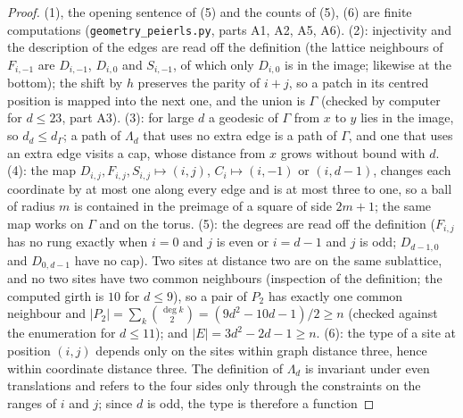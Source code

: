\documentclass[aps,prx,onecolumn,10pt,nofootinbib,longbibliography,floatfix]{revtex4-2}
\theoremstyle{remark}
\begin{document}
\begin{proof}
(1), the opening sentence of (5) and the counts of (5), (6) are finite computations %
(\texttt{geometry\_peierls.py}, parts A1, A2, A5, A6). (2): injectivity and the description of the edges are read %
off the definition (the lattice neighbours of $F_{i,-1}$ are $D_{i,-1}$, $D_{i,0}$ and $S_{i,-1}$, of which only
$D_{i,0}$ is in the image; likewise at the bottom); the shift by $h$ preserves the parity of $i+j$, so a patch in
its centred position is mapped into the next one, and the union is $\Gamma$ (checked by computer for $d\le23$, part %
A3). (3): for large $d$ a geodesic of $\Gamma$ from $x$ to $y$ lies in the image, so $d_d\le d_\Gamma$; a path of %
$\Lambda_d$ that uses no extra edge is a path of $\Gamma$, and one that uses an extra edge visits a cap, whose
distance from $x$ grows without bound with $d$. (4): the map $D_{i,j},F_{i,j},S_{i,j}\mapsto(i,j)$, %
$C_i\mapsto(i,-1)$ or $(i,d-1)$, changes each coordinate by at most one along every edge and is at most three to one,
so a ball of radius $m$ is contained in the preimage of a square of side $2m+1$; the same map works on $\Gamma$ and
on the torus. (5): the degrees are read off the definition ($F_{i,j}$ has no rung exactly when $i=0$ and $j$ is even or %
$i=d-1$ and $j$ is odd; $D_{d-1,0}$ and $D_{0,d-1}$ have no cap). Two sites at distance two are on the same
sublattice, and no two sites have two common neighbours (inspection of the definition; the computed girth is $10$ %
for $d\le9$), so a pair of $P_2$ has exactly one common neighbour and
$|P_2|=\sum_k\binom{\deg k}{2}=(9d^2-10d-1)/2\ge n$ (checked against the enumeration for $d\le11$); and %
$|E|=3d^2-2d-1\ge n$.
(6): the type of a site at position $(i,j)$ depends only on the sites within graph distance three, hence within %
coordinate distance three. The definition of $\Lambda_d$ is invariant under even translations and refers to the four
sides only through the constraints on the ranges of $i$ and $j$; since $d$ is odd, the type is therefore a function

\end{proof}
\end{document}
